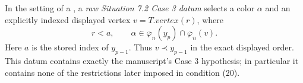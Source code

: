 \begin{definition}
In the setting of a
, a \emph{raw Situation 7.2
Case 3 datum} selects a color \(\alpha\) and an explicitly indexed displayed
vertex \(v=T.\mathit{vertex}(r)\), where
\[
 r<a,
 \qquad
 \alpha\in\overline\varphi_n(y_p)
              \cap\overline\varphi_n(v).
\]
Here \(a\) is the stored index of \(y_{p-1}\).  Thus \(v\prec y_{p-1}\)
in the exact displayed order.  This datum contains exactly the manuscript's
Case 3 hypothesis; in particular it contains none of the restrictions later
imposed in condition (20).
\end{definition}
